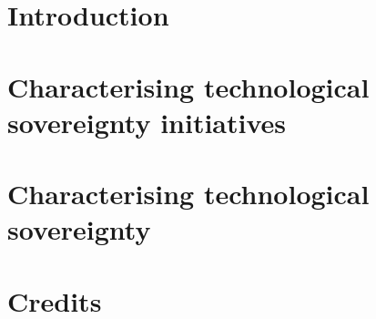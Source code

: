 \documentclass[a5paper,11pt]{book}
\begin{document}
\frontmatter
\pagestyle{empty}
\begin{center}
 \hspace{0pt}
  \vfill
  \vspace*{0.2\textheight}
  
  \vfill
 \hspace{0pt}
\end{center}
\pagebreak

\maketitle

\pagestyle{empty}


\pagestyle{fancy}

\tableofcontents
\thispagestyle{fancy}


\chapter{\prefacename}
\thispagestyle{fancy}


\mainmatter
\chapter{Introduction}
\thispagestyle{fancy}
 

\chapter{Characterising technological sovereignty initiatives}
 
 
 
 
 

\chapter{Characterising technological sovereignty}
 
 
 
 
 

\chapter{Credits}
 
\end{document}
